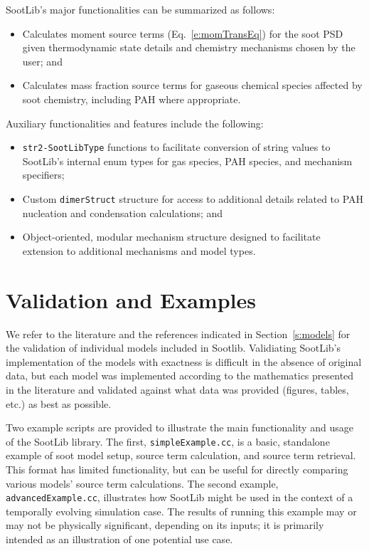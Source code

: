 \documentclass[preprint,letterpaper]{elsarticle}
\begin{document}
SootLib's major functionalities can be summarized as follows:
\begin{itemize}
    \item Calculates moment source terms (Eq.~\ref{e:momTransEq}) for the soot PSD given thermodynamic state details and chemistry mechanisms chosen by the user; and
    \item Calculates mass fraction source terms for gaseous chemical species affected by soot chemistry, including PAH where appropriate.
\end{itemize}
Auxiliary functionalities and features include the following:
\begin{itemize}
    \item \texttt{str2-SootLibType} functions to facilitate conversion of string values to SootLib's internal enum types for gas species, PAH species, and mechanism specifiers;
    \item Custom \texttt{dimerStruct} structure for access to additional details related to PAH nucleation and condensation calculations; and
    \item Object-oriented, modular mechanism structure designed to facilitate extension to additional mechanisms and model types.
\end{itemize}


\section{Validation and Examples}
\label{s:examples}

We refer to the literature and the references indicated in Section~\ref{s:models} for the validation of individual models included in Sootlib. Validiating SootLib's implementation of the models with exactness is difficult in the absence of original data, but each model was implemented according to the mathematics presented in the literature and validated against what data was provided (figures, tables, etc.) as best as possible.

Two example scripts are provided to illustrate the main functionality and usage of the SootLib library. The first, \texttt{simpleExample.cc}, is a basic, standalone example of soot model setup, source term calculation, and source term retrieval. This format has limited functionality, but can be useful for directly comparing various models' source term calculations. The second example, \texttt{advancedExample.cc}, illustrates how SootLib might be used in the context of a temporally evolving simulation case. The results of running this example may or may not be physically significant, depending on its inputs; it is primarily intended as an illustration of one potential use case.
\end{document}
